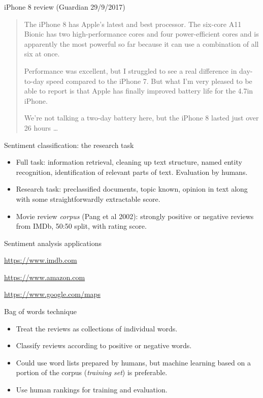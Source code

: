\documentclass[compress]{beamer}
\begin{document}
\begin{frame}{iPhone 8 review (Guardian 29/9/2017)}
  \begin{quote} 
    The iPhone 8 has Apple's latest and best processor. The six-core
    A11 Bionic has two high-performance cores and four power-efficient
    cores and is apparently the most powerful so far because it can
    use a combination of all six at once.

    Performance was excellent, but I struggled to see a real
    difference in day-to-day speed compared to the iPhone 7. But what
    I'm very pleased to be able to report is that Apple has finally
    improved battery life for the 4.7in iPhone.

    We're not talking a two-day battery here, but the iPhone 8 lasted
    just over 26 hours \ldots
\end{quote}
\end{frame}

\begin{frame}{Sentiment classification: the research task}
  \begin{itemize}
  \item Full task: information retrieval, cleaning up text structure,
    named entity recognition, identification of relevant parts of
    text. Evaluation by humans.
  \item Research task: preclassified documents, topic known, opinion
    in text along with some straightforwardly extractable score.
  \item Movie review \emph{corpus} (Pang et al 2002): strongly
    positive or negative reviews from IMDb, 50:50 split, with rating
    score.
\end{itemize}
\end{frame}


\begin{frame}{Sentiment analysis applications}

  \url{https://www.imdb.com}

  \url{https://www.amazon.com}

  \url{https://www.google.com/maps}

\end{frame}


\begin{frame}{Bag of words technique}
  \begin{itemize}
  \item Treat the reviews as collections of individual words.
  \item Classify reviews according to positive or negative words.
  \item Could use word lists prepared by humans, but machine learning
    based on a portion of the corpus (\emph{training set}) is
    preferable.
  \item Use human rankings for training and evaluation.
\end{itemize}
\end{frame}
\end{document}
